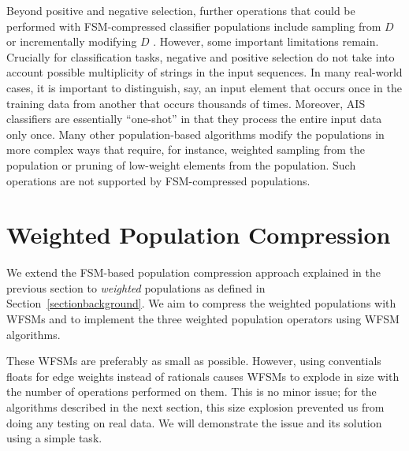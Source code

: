 \documentclass{llncs}
\begin{document}
Beyond positive and negative selection, further operations that could be performed with FSM-compressed classifier populations include sampling from $D$ or incrementally modifying $D$ \cite{Textor2014}. However, some important limitations remain. Crucially for classification tasks, negative and positive selection do not take into account possible multiplicity of strings in the input sequences. In many real-world cases, it is important to distinguish, say, an input element that occurs once in the training data from another that occurs thousands of times. Moreover, AIS classifiers are essentially ``one-shot'' in that they process the entire input data only once. Many other population-based algorithms modify the populations in more complex ways that require, for instance, weighted sampling from the population or pruning of low-weight elements from the population. Such operations are not supported by FSM-compressed populations.




\section{Weighted Population Compression}
\label{sectionfsms}\label{sectionwhyrationals}

We extend the FSM-based population compression approach explained in
the previous section to \emph{weighted} populations as defined in
Section~\ref{sectionbackground}.
We aim to compress the weighted populations with WFSMs and to
implement the three weighted population operators using WFSM
algorithms.

These WFSMs are preferably as small as possible.
However, using conventials floats for edge weights instead of
rationals causes WFSMs to explode in size with the number of
operations performed on them.
This is no minor issue;
for the algorithms described in the next section,
this size explosion prevented us from doing any testing on
real data. We will demonstrate the issue and its solution
using a simple task.
\end{document}
